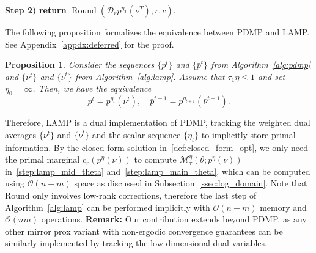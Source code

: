 \documentclass[10pt]{article}
\newcommand{\diag}[1]{\mathcal{D}_{#1}}
\theoremstyle{plain}
\newtheorem{proposition}[theorem]{Proposition}
\theoremstyle{definition}
\theoremstyle{remark}
\newcommand{\col}{\bm{\mathrm{c}}}
\begin{document}
\begin{minipage}[t]{0.49\linewidth}
\begin{algorithm}[H]
\begin{algorithmic}

        \ENDFOR
        \STATE \textbf{Step 2)} \textbf{return} $\operatorname{Round}(\diag{r}p^{\eta_{T}}(\nu^{T}), r, c)$.
    \end{algorithmic}
\end{algorithm}
\end{minipage}




The following proposition formalizes the equivalence between PDMP and LAMP. See Appendix~\ref{appdx:deferred} for the proof.
\begin{proposition}\label{prop:equivalence}
    Consider the sequences $\{p^t\}$ and $\{\bar p^{t}\}$ from Algorithm~\ref{alg:pdmp} and $\{\nu^t\}$ and $\{\bar{\nu}^{t}\}$ from Algorithm~\ref{alg:lamp}. Assume that $\tau_1\eta\leq 1$ and set $\eta_0=\infty$. Then, we have the equivalence
    \begin{equation*}
        p^t = p^{\eta_t}(\nu^t),\quad \bar p^{t+1} =  p^{\eta_{t+1}}(\bar\nu^{t+1}).
    \end{equation*}
\end{proposition}

Therefore, LAMP is a dual implementation of PDMP, tracking the weighted dual averages $\{\nu^t\}$ and $\{\bar\nu^t\}$ and the scalar sequence $\{\eta_t\}$ to implicitly store primal information. By the closed-form solution in~\eqref{def:closed_form_opt}, we only need the primal marginal $\col_r(p^\eta(\nu))$ to compute $\mathcal{M}^{\eta }_\tau(\theta;p^\eta(\nu))$ in~\eqref{step:lamp_mid_theta} and~\eqref{step:lamp_main_theta}, which can be computed using $\mathcal{O}(n+m)$ space as discussed in Subsection~\ref{ssec:log_domain}. Note that Round only involves low-rank corrections, therefore the last step of Algorithm~\ref{alg:lamp} can be performed implicitly with $\mathcal{O}(n+m)$ memory and $\mathcal{O}(nm)$ operations. \textbf{Remark:} Our contribution extends beyond PDMP, as any other mirror prox variant with non-ergodic convergence guarantees can be similarly implemented by tracking the low-dimensional dual variables.
\end{document}
